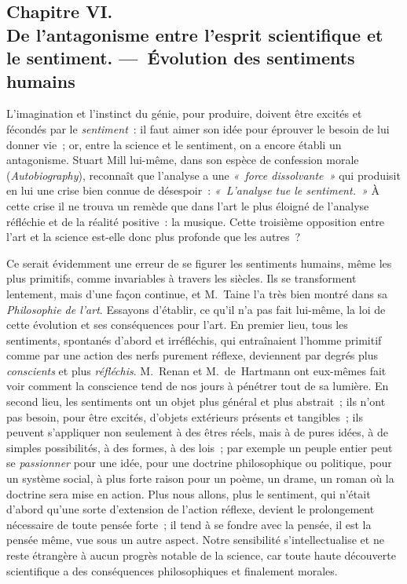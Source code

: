 \documentclass[french,twoside]{book} %
\begin{document}
\subsection[{Chapitre VI. De l’antagonisme entre l’esprit scientifique et le sentiment. — Évolution des sentiments humains}]{Chapitre VI. \\
De l’antagonisme entre l’esprit scientifique et le sentiment. — Évolution des sentiments humains}
\noindent  L’imagination et l’instinct du génie, pour produire, doivent être excités et fécondés par le \emph{sentiment} : il faut aimer son idée pour éprouver le besoin de lui donner vie ; or, entre la science et le sentiment, on a encore établi un antagonisme. Stuart Mill lui-même, dans son espèce de confession morale (\emph{Autobiography}), reconnaît que l’analyse a une \emph{« force dissolvante »} qui produisit en lui une crise bien connue de désespoir : \emph{« L’analyse tue le sentiment. »} À cette crise il ne trouva un remède que dans l’art le plus éloigné de l’analyse réfléchie et de la réalité positive : la musique. Cette troisième opposition entre l’art et la science est-elle donc plus profonde que les autres ?\par
Ce serait évidemment une erreur de se figurer les sentiments humains, même les plus primitifs, comme invariables à travers les siècles. Ils se transforment lentement, mais d’une façon continue, et M. Taine l’a très bien montré dans sa \emph{Philosophie de l’art}. Essayons d’établir, ce qu’il  n’a pas fait lui-même, la loi de cette évolution et ses conséquences pour l’art. En premier lieu, tous les sentiments, spontanés d’abord et irréfléchis, qui entraînaient l’homme primitif comme par une action des nerfs purement réflexe, deviennent par degrés plus \emph{conscients} et plus \emph{réfléchis}. M. Renan et M. de Hartmann ont eux-mêmes fait voir comment la conscience tend de nos jours à pénétrer tout de sa lumière. En second lieu, les sentiments ont un objet plus général et plus abstrait ; ils n’ont pas besoin, pour être excités, d’objets extérieurs présents et tangibles ; ils peuvent s’appliquer non seulement à des êtres réels, mais à de pures idées, à de simples possibilités, à des formes, à des lois ; par exemple un peuple entier peut se \emph{passionner} pour une idée, pour une doctrine philosophique ou politique, pour un système social, à plus forte raison pour un poème, un drame, un roman où la doctrine sera mise en action. Plus nous allons, plus le sentiment, qui n’était d’abord qu’une sorte d’extension de l’action réflexe, devient le prolongement nécessaire de toute pensée forte ; il tend à se fondre avec la pensée, il est la pensée même, vue sous un autre aspect. Notre sensibilité s’intellectualise et ne reste étrangère à aucun progrès notable de la science, car toute haute découverte scientifique a des conséquences philosophiques et finalement morales.\par
\end{document}
